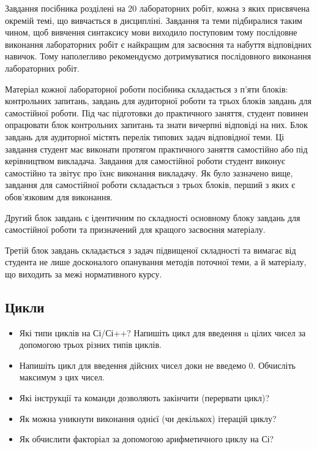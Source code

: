 \documentclass[]{article}
\begin{document}
Завдання посібника розділені на 20 лабораторних робіт, кожна з яких
присвячена окремій темі, що вивчається в дисципліні. Завдання та теми
підбиралися таким чином, щоб вивчення синтаксису мови виходило
поступовим тому послідовне виконання лабораторних робіт є найкращим для
засвоєння та набуття відповідних навичок. Тому наполегливо рекомендуємо
дотримуватися послідовного виконання лабораторних робіт.

Матеріал кожної лабораторної роботи посібника складається з п'яти
блоків: контрольних запитань, завдань для аудиторної роботи та трьох
блоків завдань для самостійної роботи. Під час підготовки до практичного
заняття, студент повинен опрацювати блок контрольних запитань та знати
вичерпні відповіді на них. Блок завдань для аудиторної містять перелік
типових задач відповідної теми. Ці завдання студент має виконати
протягом практичного заняття самостійно або під керівництвом викладача.
Завдання для самостійної роботи студент виконує самостійно та звітує про
їхнє виконання викладачу. Як було зазначено вище, завдання для
самостійної роботи складається з трьох блоків, перший з яких є
обов'язковим для виконання.

Другий блок завдань є ідентичним по складності основному блоку завдань
для самостійної роботи та призначений для кращого засвоєння матеріалу.

Третій блок завдань складається з задач підвищеної складності та вимагає
від студента не лише досконалого опанування методів поточної теми, а й
матеріалу, що виходить за межі нормативного курсу.


\newpage
\subsection{ Цикли }
\setcounter{subsection}{1}

\begin{itemize}
\item
  Які типи циклів на Сі/Сі++? Напишіть цикл для введення n цілих чисел
  за допомогою трьох різних типів циклів.
\item
  Напишіть цикл для введення дійсних чисел доки не введемо 0. Обчисліть
  максимум з цих чисел.
\item
  Які інструкції та команди дозволяють закінчити (перервати цикл)?
\item
  Як можна уникнути виконання однієї (чи декількох) ітерацій циклу?
\item
  Як обчислити факторіал за допомогою арифметичного циклу на Сі?
\end{itemize}
\end{document}
